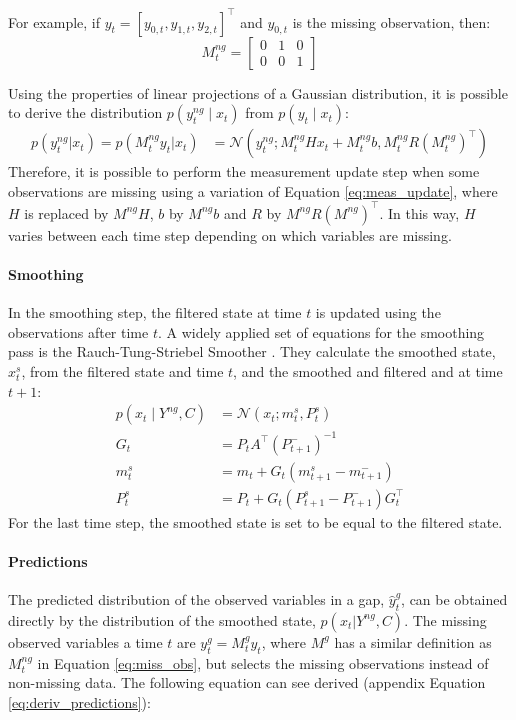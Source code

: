 \documentclass{article}
\newcommand{\norm}[3]{\mathcal{N}\left(#1; #2, #3\right)} %
\begin{document}
For example, if $y_t = [y_{0,t}, y_{1,t}, y_{2,t}]^\top$ and $y_{0,t}$ is the missing observation, then:
\begin{equation*}
 M^{ng}_t = \left[\begin{array}{ccc}
    0 & 1 & 0 \\
    0 & 0 & 1
\end{array}\right]
\end{equation*}

Using the properties of linear projections of a Gaussian distribution, it is possible to derive the distribution $p(y^{ng}_t \mid x_t)$ from $p(y_t \mid x_t)$:
 \begin{align*}
   p(y^{ng}_t|x_t) = p(M^{ng}_ty_t|x_t) &=   \norm{y^{ng}_t}{M^{ng}_tHx_t + M^{ng}_tb}{M^{ng}_tR(M^{ng}_t)^\top}%
\end{align*}
Therefore, it is possible to perform the measurement update step when some observations are missing using a variation of Equation \ref{eq:meas_update}, where $H$ is replaced by $M^{ng}H$, $b$ by $M^{ng}b$ and $R$ by $M^{ng}R(M^{ng})^\top$. In this way, $H$ varies between each time step depending on which variables are missing.

\paragraph{Smoothing}

In the smoothing step, the filtered state at time $t$ is updated using the observations after time $t$. A widely applied set of equations for the smoothing pass is the Rauch-Tung-Striebel Smoother \cite{rauch_maximum_1965}. They calculate the smoothed state, $x_t^s$, from the filtered state and time $t$, and the smoothed and filtered and at time $t+1$:
\begin{equation}
\begin{aligned}\label{eq:smoother}
    p(x_t \mid Y^{ng}, C) &= \norm{x_t}{m_t^s}{P_t^s} \\
    G_t &= P_tA^\top(P_{t+1}^-)^{-1}\\
    m_t^s &= m_t + G_t(m_{t+1}^s - m_{t+1}^-) \\
    P_t^s &= P_t + G_t(P_{t+1}^s - P_{t+1}^-)G_t^\top
\end{aligned}
\end{equation}
For the last time step, the smoothed state is set to be equal to the filtered state.

\paragraph{Predictions} The predicted distribution of the observed variables in a gap, $\hat{y}^g_t$, can be obtained directly by the distribution of the smoothed state, $p(x_t | Y^{ng}, C)$.
The missing observed variables a time $t$ are $y^g_t = M^g_ty_t$, where $M^{g}$ has a similar definition as $M^{ng}_t$ in Equation \ref{eq:miss_obs}, but selects the missing observations instead of non-missing data.
The following equation can see derived (appendix Equation \ref{eq:deriv_predictions}):
\end{document}
